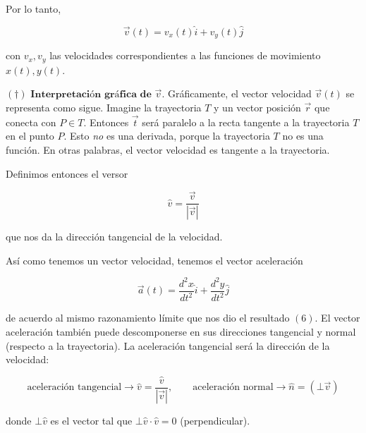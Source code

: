 \documentclass[12pt]{article}
\theoremstyle{definition}
\begin{document}
Por lo tanto, 

\begin{equation}
    \vec{v}(t) = v_x(t) \hat{i} + v_y(t) \hat{j}
\end{equation}

con $v_x, v_y$ las velocidades correspondientes a las funciones de movimiento $x(t), y(t)$.

\begin{shaded}

    $(\dagger)  \textbf{ Interpretación gráfica de $\vec{v}$}$. Gráficamente, el
    vector velocidad $\vec{v}(t)$ se representa como sigue. Imagine la
    trayectoria $T$ y un vector posición $\vec{r}$ que conecta con $P \in T$.
    Entonces $\vec{t}$ será paralelo a la recta tangente a la trayectoria $T$ en
    el punto $P$. Esto \textit{no} es una derivada, porque la trayectoria $T$ no
    es una función. En otras palabras, el vector velocidad es tangente a la
    trayectoria.
\end{shaded}

Definimos entonces el versor 

\begin{equation}
    \hat{v} = \frac{\vec{v}}{\left| \vec{v} \right| }
\end{equation}

que nos da la dirección tangencial de la velocidad. 

Así como tenemos un vector velocidad, tenemos el vector aceleración 

\begin{equation}
    \vec{a}(t) = \frac{d^2 x}{dt^2} \hat{i} + \frac{d^2 y}{dt^2} \hat{j}
\end{equation}

de acuerdo al mismo razonamiento límite que nos dio el resultado $(6)$. El
vector aceleración también puede descomponerse en sus direcciones tangencial y
normal (respecto a la trayectoria). La aceleración tangencial será la dirección
de la velocidad: 

\begin{equation}
    \text{aceleración tangencial} \to  \hat{v} = \frac{\hat{v}}{\left| \vec{v}
    \right| }, \qquad \text{aceleración normal} \to \hat{n} = (\bot  \vec{v})
\end{equation}

donde $\bot \hat{v}$ es el vector tal que $\bot  \hat{v} \cdot \hat{v} = 0$
(perpendicular). 
\end{document}
